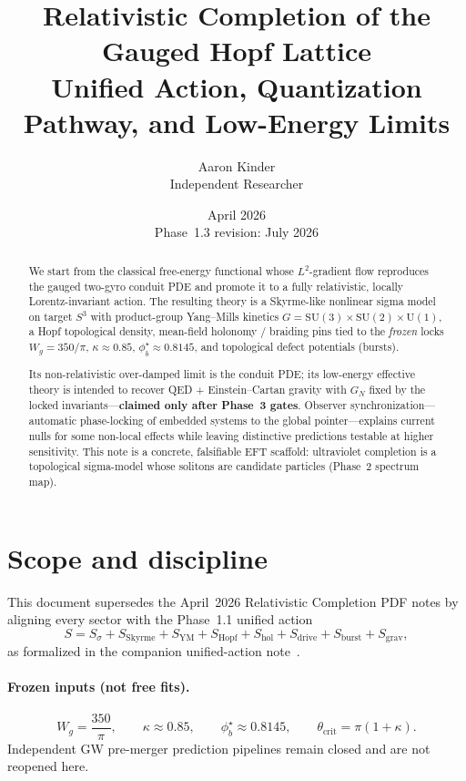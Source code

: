 \documentclass[11pt]{article}
\title{Relativistic Completion of the Gauged Hopf Lattice\\
\large Unified Action, Quantization Pathway, and Low-Energy Limits}
\author{Aaron Kinder \\ Independent Researcher}
\date{April 2026 \\ \small Phase~1.3 revision: July 2026}
\begin{document}
\maketitle

\begin{abstract}
We start from the classical free-energy functional whose $L^2$-gradient flow
reproduces the gauged two-gyro conduit PDE and promote it to a fully relativistic,
locally Lorentz-invariant action. The resulting theory is a Skyrme-like nonlinear
sigma model on target $S^3$ with product-group Yang--Mills kinetics
$G=\mathrm{SU}(3)\times\mathrm{SU}(2)\times\mathrm{U}(1)$, a Hopf topological
density, mean-field holonomy / braiding pins tied to the \emph{frozen} locks
$W_g=350/\pi$, $\kappa\approx 0.85$, $\phi_b^\star\approx 0.8145$, and topological
defect potentials (bursts).

Its non-relativistic over-damped limit is the conduit PDE; its low-energy effective
theory is intended to recover QED + Einstein--Cartan gravity with $G_N$ fixed by the
locked invariants---\textbf{claimed only after Phase~3 gates}. Observer
synchronization---automatic phase-locking of embedded systems to the global
pointer---explains current nulls for some non-local effects while leaving distinctive
predictions testable at higher sensitivity. This note is a concrete, falsifiable EFT
scaffold: ultraviolet completion is a topological sigma-model whose solitons are
candidate particles (Phase~2 spectrum map).
\end{abstract}

\section{Scope and discipline}

This document supersedes the April~2026 Relativistic Completion PDF notes by aligning
every sector with the Phase~1.1 unified action
\begin{equation}
S=S_\sigma+S_{\mathrm{Skyrme}}+S_{\mathrm{YM}}
+S_{\mathrm{Hopf}}+S_{\mathrm{hol}}+S_{\mathrm{drive}}
+S_{\mathrm{burst}}+S_{\mathrm{grav}},
\label{eq:unified-action}
\end{equation}
as formalized in the companion unified-action note~\cite{lag}.

\paragraph{Frozen inputs (not free fits).}
\[
W_g=\frac{350}{\pi},\qquad
\kappa\approx 0.85,\qquad
\phi_b^\star\approx 0.8145,\qquad
\theta_{\mathrm{crit}}=\pi(1+\kappa).
\]
Independent GW pre-merger prediction pipelines remain closed and are not reopened here.
\end{document}
